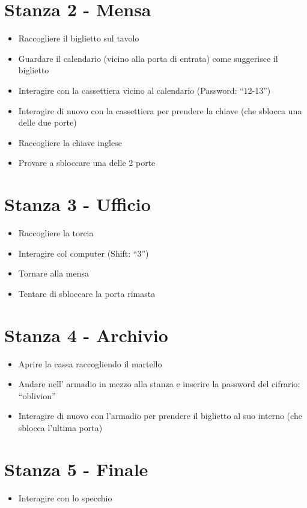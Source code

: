 \documentclass[a4paper,12pt]{report}
\begin{document}
\section{Stanza 2 - Mensa}
\begin{itemize}
	\item Raccogliere il biglietto sul tavolo 
	\item Guardare il calendario (vicino alla porta di entrata) come suggerisce il biglietto 
	\item Interagire con la cassettiera vicino al calendario (Password: “12-13”) 
	\item Interagire di nuovo con la cassettiera per prendere la chiave (che sblocca una delle due porte) 
	\item Raccogliere la chiave inglese  
	\item Provare a sbloccare una delle 2 porte
\end{itemize}
%
\section{Stanza 3 - Ufficio}
\begin{itemize}
	\item Raccogliere la torcia 
	\item Interagire col computer (Shift: “3”) 
	\item Tornare alla mensa 
	\item Tentare di sbloccare la porta rimasta 
\end{itemize}
%
\section{Stanza 4 - Archivio}
\begin{itemize}
	\item Aprire la cassa raccogliendo il martello
	\item Andare nell’ armadio in mezzo alla stanza e inserire la password del cifrario: “oblivion” 
	\item Interagire di nuovo con l’armadio per prendere il biglietto al suo interno (che sblocca l’ultima porta) 
\end{itemize}
%
\section{Stanza 5 - Finale}
\begin{itemize}
	\item Interagire con lo specchio
\end{itemize}
\end{document}
